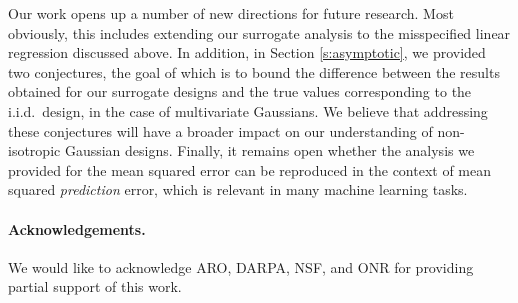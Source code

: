 \documentclass[11pt]{article}
\begin{document}
Our work opens up a number of new directions for future research.
Most obviously, this includes extending our surrogate analysis to the misspecified linear regression discussed above. 
In addition, in Section \ref{s:asymptotic}, we provided two conjectures, the goal of which is to bound the difference between the results obtained for our surrogate designs and the true values corresponding to the i.i.d.~design, in the case of multivariate Gaussians. 
We believe that addressing these conjectures will have a broader impact on our understanding of non-isotropic Gaussian designs. 
Finally, it remains open whether the analysis we provided for the mean squared error can be reproduced in the context of mean squared \emph{prediction} error, which is relevant in many machine learning tasks.


\paragraph{Acknowledgements.}
We would like to acknowledge ARO, DARPA, NSF, and ONR for providing partial support of this work.


%

  


  \iffalse
  
  \appendix
  
\end{document}
